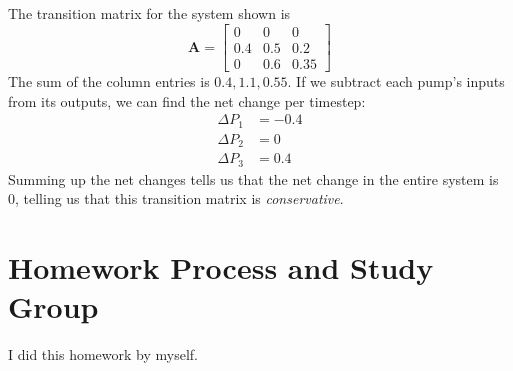 \documentclass[]{article}
\begin{document}
\subsection{}

The transition matrix for the system shown is 
\begin{equation}
	\mathbf{A} = 
	\begin{bmatrix}
	0 & 0 & 0 \\
	0.4 & 0.5 & 0.2 \\
	0 & 0.6 & 0.35
	\end{bmatrix}
\end{equation}
The sum of the column entries is \(0.4, 1.1, 0.55\). If we subtract each pump's inputs from its outputs, we can find the net change per timestep:
\begin{align}
		\Delta P_1 &= -0.4 \\
		\Delta P_2 &= 0 \\
		\Delta P_3 &= 0.4
\end{align}
Summing up the net changes tells us that the net change in the entire system is 0, telling us that this transition matrix is \emph{conservative}. 
\section{Homework Process and Study Group}

I did this homework by myself. 

\newpage


\end{document}

